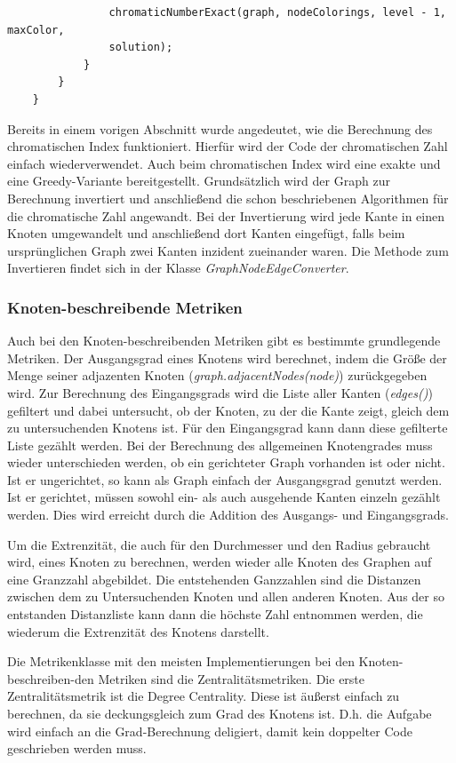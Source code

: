 \documentclass[a4paper,12pt,ngerman,chapterprefix=false,listof=totoc,bibliography=totoc]{scrreprt}
\begin{document}
{{{\begin{lstlisting}
				chromaticNumberExact(graph, nodeColorings, level - 1, maxColor,
				solution);
			}
		}
	}
\end{lstlisting}
Bereits in einem vorigen Abschnitt wurde angedeutet, wie die Berechnung des chromatischen Index funktioniert. Hierfür wird der Code der chromatischen Zahl einfach wiederverwendet. Auch beim chromatischen Index wird eine exakte und eine Greedy-Variante bereitgestellt. Grundsätzlich wird der Graph zur Berechnung invertiert und anschließend die schon beschriebenen Algorithmen für die chromatische Zahl angewandt. Bei der Invertierung wird jede Kante in einen Knoten umgewandelt und anschließend dort Kanten eingefügt, falls beim ursprünglichen Graph zwei Kanten inzident zueinander waren. Die Methode zum Invertieren findet sich in der Klasse \textit{GraphNodeEdgeConverter}.
}
\subsubsection*{Knoten-beschreibende Metriken}
{
Auch bei den Knoten-beschreibenden Metriken gibt es bestimmte grundlegende Metriken. Der Ausgangsgrad eines Knotens wird berechnet, indem die Größe der Menge seiner adjazenten Knoten (\textit{graph.adjacentNodes(node)}) zurückgegeben wird. Zur Berechnung des Eingangsgrads wird die Liste aller Kanten (\textit{edges()}) gefiltert und dabei untersucht, ob der Knoten, zu der die Kante zeigt, gleich dem zu untersuchenden Knotens ist. Für den Eingangsgrad kann dann diese gefilterte Liste gezählt werden. Bei der Berechnung des allgemeinen Knotengrades muss wieder unterschieden werden, ob ein gerichteter Graph vorhanden ist oder nicht. Ist er ungerichtet, so kann als Graph einfach der Ausgangsgrad genutzt werden. Ist er gerichtet, müssen sowohl ein- als auch ausgehende Kanten einzeln gezählt werden. Dies wird erreicht durch die Addition des Ausgangs- und Eingangsgrads.

Um die Extrenzität, die auch für den Durchmesser und den Radius gebraucht wird, eines Knoten zu berechnen, werden wieder alle Knoten des Graphen auf eine Granzzahl abgebildet. Die entstehenden Ganzzahlen sind die Distanzen zwischen dem zu Untersuchenden Knoten und allen anderen Knoten. Aus der so entstanden Distanzliste kann dann die höchste Zahl entnommen werden, die wiederum die Extrenzität des Knotens darstellt.

Die Metrikenklasse mit den meisten Implementierungen bei den Knoten-beschreiben-den Metriken sind die Zentralitätsmetriken. Die erste Zentralitätsmetrik ist die Degree Centrality. Diese ist äußerst einfach zu berechnen, da sie deckungsgleich zum Grad des Knotens ist. D.h. die Aufgabe wird einfach an die Grad-Berechnung deligiert, damit kein doppelter Code geschrieben werden muss.

}}}
\end{document}
